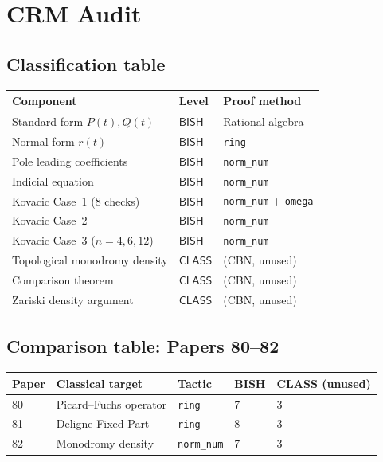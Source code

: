 \documentclass[11pt]{article}
\theoremstyle{plain}
\theoremstyle{definition}
\theoremstyle{remark}
\newcommand{\BISH}{\mathsf{BISH}}
\newcommand{\CLASS}{\mathsf{CLASS}}
\begin{document}
\section{CRM Audit}
\label{sec:audit}

\subsection{Classification table}

\begin{center}
\renewcommand{\arraystretch}{1.1}
\begin{tabular}{@{}lll@{}}
\toprule
Component & Level & Proof method \\
\midrule
Standard form $P(t), Q(t)$ & $\BISH$ & Rational algebra \\
Normal form $r(t)$ & $\BISH$ & \texttt{ring} \\
Pole leading coefficients & $\BISH$ & \texttt{norm\_num} \\
Indicial equation & $\BISH$ & \texttt{norm\_num} \\
Kovacic Case~1 (8 checks) & $\BISH$ & \texttt{norm\_num} + \texttt{omega} \\
Kovacic Case~2 & $\BISH$ & \texttt{norm\_num} \\
Kovacic Case~3 ($n = 4,6,12$) & $\BISH$ & \texttt{norm\_num} \\
\midrule
Topological monodromy density & $\CLASS$ & (CBN, unused) \\
Comparison theorem & $\CLASS$ & (CBN, unused) \\
Zariski density argument & $\CLASS$ & (CBN, unused) \\
\bottomrule
\end{tabular}
\end{center}

\subsection{Comparison table: Papers 80--82}

\begin{center}
\renewcommand{\arraystretch}{1.1}
\begin{tabular}{@{}llllp{3.5cm}@{}}
\toprule
Paper & Classical target & Tactic & BISH & CLASS (unused) \\
\midrule
80 & Picard--Fuchs operator & \texttt{ring} & 7 & 3 \\
81 & Deligne Fixed Part & \texttt{ring} & 8 & 3 \\
82 & Monodromy density & \texttt{norm\_num} & 7 & 3 \\
\bottomrule
\end{tabular}
\end{center}
\end{document}
